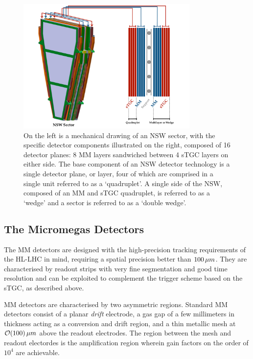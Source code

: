\begin{figure}[!htb]
    \begin{center}
        \includegraphics[width=0.8\textwidth]{figures/nsw/nsw_sector_layoutPDF}
        \caption{
            On the left is a mechanical drawing of an NSW sector, with the specific detector
            components illustrated on the right, composed of 16 detector planes: 8 MM layers
            sandwiched between 4 sTGC layers on either side.
            The base component of an NSW detector technology is a single detector plane,
            or layer, four of which are comprised in a single unit referred to as
            a `quadruplet'.
            A single side of the NSW, composed of an MM and sTGC quadruplet, is
            referred to as a `wedge' and a sector is referred to as a `double wedge'.
        }
        \label{fig:nsw_sector_layout}
    \end{center}
\end{figure}

\subsection{The Micromegas Detectors}
\label{sec:nsw_mm}

The MM detectors are designed with the high-precision tracking requirements of the HL-LHC
in mind, requiring a spatial precision better than $100\,\mu m$.
They are characterised by readout strips with very fine segmentation and good
time resolution and can be exploited to complement the trigger scheme based on the sTGC, as
described above.

MM detectors are characterised by two asymmetric regions.
Standard MM detectors consist of a planar \textit{drift} electrode, a gas gap of
a few millimeters in thickness acting as a conversion and drift region, and a thin
metallic mesh at $\mathcal{O}(100)\,\mu m$ above the readout electrodes.
The region between the mesh and readout electordes is the amplification region wherein
gain factors on the order of $10^4$ are achievable.

